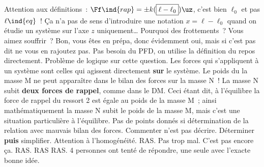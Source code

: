 \documentclass[a4paper, 10pt, final, garamond]{book}
\begin{document}
\begin{enumerate}
	Attention aux définitions~: $\Ff\ind{rap} = \pm k
		(\boxed{\ell-\ell_0})\uz$, c'est bien $\ell_0$ et pas $\ell\ind{eq}$~!
	Ça n'a pas de sens d'introduire une notation $x = \ell - \ell_0$ quand on
	étudie un système sur l'axe $z$ uniquement…
	Pourquoi des frottements~? Vous aimez souffrir~? Bon, vous êtes en prépa, donc
	évidemment oui, mais si c'est pas dit ne vous en rajoutez pas.
	Pas besoin du PFD, on utilise la définition du repos directement.
	Problème de logique sur cette question. Les forces qui s'appliquent
	à un système sont celles qui agissent directement \textbf{sur} le système. Le
	poids du la masse M ne peut apparaître dans le bilan des forces sur la masse
	N~! La masse N subit \textbf{deux forces de rappel}, comme dans le DM.
	\smallbreak
	Ceci étant dit, à l'équilibre la force de rappel du ressort 2 est égale au
	poids de la masse M~; ainsi mathématiquement la masse N subit le poids de la
	masse M, mais c'est une situation particulière à l'équilibre.
	Pas de points donnés si détermination de la relation avec mauvais
	bilan des forces.
	Commenter n'est pas décrire.
	Déterminer \textbf{puis} simplifier.
	Attention à l'homogénéité.
	RAS.
	Pas trop mal.
	C'est pas encore ça.
	RAS.
	RAS
	RAS. 4 personnes ont tenté de répondre, une seule avec l'exacte
	bonne idée.
\end{enumerate}
\end{document}
